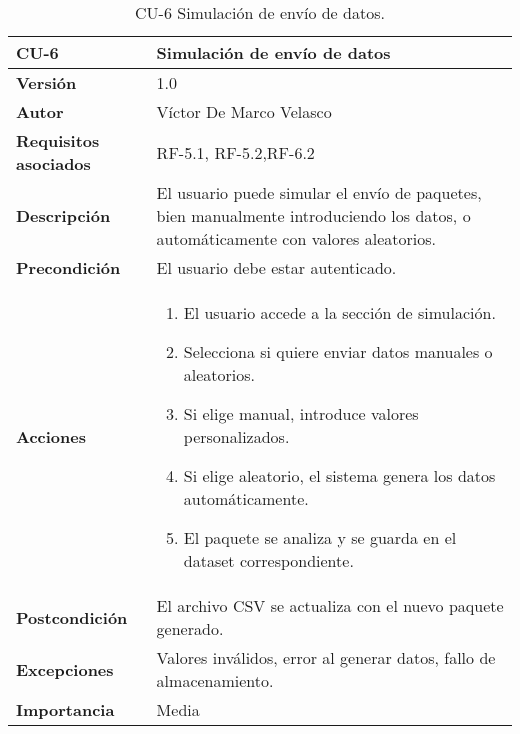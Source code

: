 \begin{table}[p]
	\centering
	\begin{tabularx}{\linewidth}{ p{} p{} }
		\toprule
		\textbf{CU-6}    & Simulación de envío de datos \\
		\toprule
		\textbf{Versión}              & 1.0 \\
		\textbf{Autor}                & Víctor De Marco Velasco \\
		\textbf{Requisitos asociados} & RF-5.1, RF-5.2,RF-6.2 \\
		\textbf{Descripción}          & El usuario puede simular el envío de paquetes, bien manualmente introduciendo los datos, o automáticamente con valores aleatorios. \\
		\textbf{Precondición}         & El usuario debe estar autenticado. \\
		\textbf{Acciones}             &
		\begin{enumerate}
			\item El usuario accede a la sección de simulación.
			\item Selecciona si quiere enviar datos manuales o aleatorios.
			\item Si elige manual, introduce valores personalizados.
			\item Si elige aleatorio, el sistema genera los datos automáticamente.
			\item El paquete se analiza y se guarda en el dataset correspondiente.
		\end{enumerate}\\
		\textbf{Postcondición}        & El archivo CSV se actualiza con el nuevo paquete generado. \\
		\textbf{Excepciones}          & Valores inválidos, error al generar datos, fallo de almacenamiento. \\
		\textbf{Importancia}          & Media \\
		\bottomrule
	\end{tabularx}
	\caption{CU-6 Simulación de envío de datos.}
\end{table}

